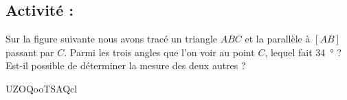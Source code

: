 
\subsection*{Activité : }

Sur la figure suivante nous avons tracé un triangle \( ABC\) et la parallèle à \( [AB]\) passant par \( C\). Parmi les trois angles que l'on voir au point \( C\), lequel fait \SI{34}{\degree} ? Est-il possible de déterminer la mesure des deux autres ?

UZOQooTSAQcl

